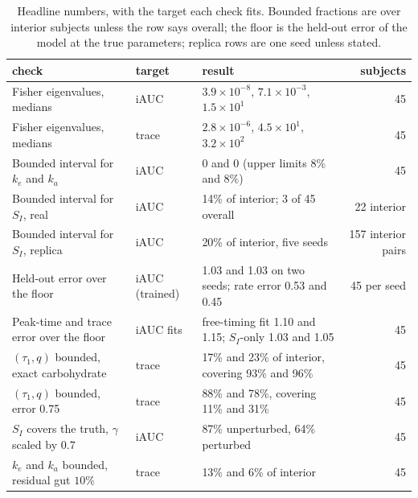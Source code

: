 \documentclass[letterpaper]{article} %
\newcommand{\figEigTraceMedianOne}{$2.8\times10^{-6}$}
\newcommand{\figEigTraceMedianThree}{$3.2\times10^{2}$}
\newcommand{\figEigTraceMedianTwo}{$4.5\times10^{1}$}
\newcommand{\figRealIaucKaBoundedAll}{0}
\newcommand{\figRealIaucKeBoundedAll}{0}
\newcommand{\figRealIaucN}{45}
\newcommand{\figRealIaucSIBoundedAll}{3}
\newcommand{\resCohortCgmSubjects}{45}
\newcommand{\resCvThreeQuarterBoundedP}{78}
\newcommand{\resCvThreeQuarterBoundedTau}{88}
\newcommand{\resCvThreeQuarterCoverP}{31}
\newcommand{\resCvThreeQuarterCoverTau}{11}
\newcommand{\resCvZeroBoundedP}{23}
\newcommand{\resCvZeroBoundedTau}{17}
\newcommand{\resCvZeroCoverP}{96}
\newcommand{\resCvZeroCoverTau}{93}
\newcommand{\resEigMedianOne}{$3.9\times10^{-8}$}
\newcommand{\resEigMedianThree}{$1.5\times10^{1}$}
\newcommand{\resEigMedianTwo}{$7.1\times10^{-3}$}
\newcommand{\resFloorPeakRandomZeroOneRatio}{1.03}
\newcommand{\resFloorPeakRandomZeroThreeRatio}{1.10}
\newcommand{\resFloorTraceRandomZeroOneRatio}{1.05}
\newcommand{\resFloorTraceRandomZeroThreeRatio}{1.15}
\newcommand{\resPertBaseSICover}{87}
\newcommand{\resPertGammaDownSICover}{64}
\newcommand{\resProfileIaucKaOneHigh}{8}
\newcommand{\resProfileIaucKeOneHigh}{8}
\newcommand{\resProfileIaucSIInteriorFracOne}{14}
\newcommand{\resProfileIaucSIInteriorNOne}{22}
\newcommand{\resPvpRandomOneRatio}{1.03}
\newcommand{\resPvpRandomOneTiming}{0.45}
\newcommand{\resPvpRandomZeroN}{45}
\newcommand{\resPvpRandomZeroRatio}{1.03}
\newcommand{\resPvpRandomZeroTiming}{0.53}
\newcommand{\resResTenKaBounded}{6}
\newcommand{\resResTenKeBounded}{13}
\newcommand{\resSeedsSIBounded}{20}
\newcommand{\resSeedsSIInterior}{157}
\begin{document}
\begin{table}[t]
\centering
\small
\begin{tabular}{lllr}
\toprule
check & target & result & subjects \\
\midrule
Fisher eigenvalues, medians & iAUC & \resEigMedianOne{}, \resEigMedianTwo{}, \resEigMedianThree{} & \resCohortCgmSubjects{} \\
Fisher eigenvalues, medians & trace & \figEigTraceMedianOne{}, \figEigTraceMedianTwo{}, \figEigTraceMedianThree{} & \resCohortCgmSubjects{} \\
Bounded interval for $k_e$ and $k_a$ & iAUC & \figRealIaucKeBoundedAll{} and \figRealIaucKaBoundedAll{} (upper limits \resProfileIaucKeOneHigh\% and \resProfileIaucKaOneHigh\%) & \figRealIaucN{} \\
Bounded interval for $S_I$, real & iAUC & \resProfileIaucSIInteriorFracOne\% of interior; \figRealIaucSIBoundedAll{} of \figRealIaucN{} overall & \resProfileIaucSIInteriorNOne{} interior \\
Bounded interval for $S_I$, replica & iAUC & \resSeedsSIBounded\% of interior, five seeds & \resSeedsSIInterior{} interior pairs \\
Held-out error over the floor & iAUC (trained) & \resPvpRandomZeroRatio{} and \resPvpRandomOneRatio{} on two seeds; rate error \resPvpRandomZeroTiming{} and \resPvpRandomOneTiming{} & \resPvpRandomZeroN{} per seed \\
Peak-time and trace error over the floor & iAUC fits & free-timing fit \resFloorPeakRandomZeroThreeRatio{} and \resFloorTraceRandomZeroThreeRatio{}; $S_I$-only \resFloorPeakRandomZeroOneRatio{} and \resFloorTraceRandomZeroOneRatio{} & \resPvpRandomZeroN{} \\
$(\tau_1,q)$ bounded, exact carbohydrate & trace & \resCvZeroBoundedTau\% and \resCvZeroBoundedP\% of interior, covering \resCvZeroCoverTau\% and \resCvZeroCoverP\% & \resCohortCgmSubjects{} \\
$(\tau_1,q)$ bounded, error 0.75 & trace & \resCvThreeQuarterBoundedTau\% and \resCvThreeQuarterBoundedP\%, covering \resCvThreeQuarterCoverTau\% and \resCvThreeQuarterCoverP\% & \resCohortCgmSubjects{} \\
$S_I$ covers the truth, $\gamma$ scaled by $0.7$ & iAUC & \resPertBaseSICover\% unperturbed, \resPertGammaDownSICover\% perturbed & \resCohortCgmSubjects{} \\
$k_e$ and $k_a$ bounded, residual gut $10\%$ & trace & \resResTenKeBounded\% and \resResTenKaBounded\% of interior & \resCohortCgmSubjects{} \\
\bottomrule
\end{tabular}
\caption{Headline numbers, with the target each check fits. Bounded fractions are over interior subjects unless the row says overall; the floor is the held-out error of the model at the true parameters; replica rows are one seed unless stated.}
\label{tab:main}
\end{table}
\end{document}
